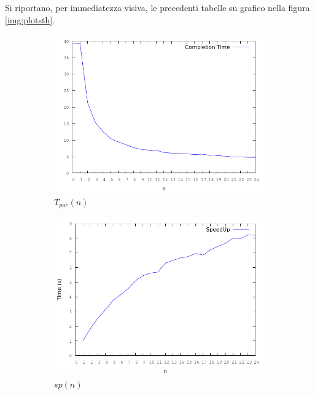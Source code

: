 \documentclass[12pt]{article}
\begin{document}
Si riportano, per immediatezza visiva, le precedenti tabelle su grafico nella figura \ref{img:plotsth}.
\begin{figure}[!htbp]
\begin{subfigure}{.55\textwidth}
  \centering
  \includegraphics[scale=.35,keepaspectratio]{th_tc.png}
  \caption{$T_{par}(n)$}
  \label{fig:tisc}
\end{subfigure} 
\begin{subfigure}{.55\textwidth}
  \centering
  \includegraphics[scale=.35,keepaspectratio]{th_sp.png}
  \caption{$sp(n)$}
  \label{fig:ftsec}
\end{subfigure}
\begin{subfigure}{.55\textwidth}
  \centering

\end{subfigure}
\end{figure}
\end{document}
